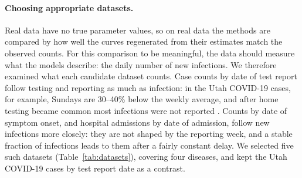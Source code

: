 \documentclass[12pt]{article}
\begin{document}
\paragraph{Choosing appropriate datasets.} Real data have no true parameter values, so on real data the
methods are compared by how well the curves regenerated from their estimates match the observed counts.
For this comparison to be meaningful, the data should measure what the models describe: the daily
number of new infections. We therefore examined what each candidate dataset counts. Case counts by date
of test report follow testing and reporting as much as infection: in the Utah COVID-19 cases, for
example, Sundays are 30--40\% below the weekly average, and after home testing became common most
infections were not reported \autocite{utahdhhs2025covid}. Counts by date of symptom onset, and hospital
admissions by date of admission, follow new infections more closely: they are not shaped by the
reporting week, and a stable fraction of infections leads to them after a fairly constant delay. We
selected five such datasets (Table~\ref{tab:datasets}), covering four diseases, and kept the Utah
COVID-19 cases by test report date as a contrast.
\end{document}
